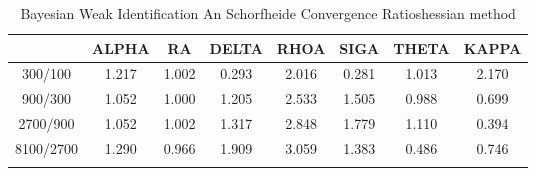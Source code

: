 \documentclass[a4paper,10pt]{article}
\begin{document}
\centering
\begin{longtable}{cccccccc}
\toprule
 & ALPHA & RA & DELTA & RHOA & SIGA & THETA & KAPPA \\
\midrule
300/100 & 1.217 & 1.002 & 0.293 & 2.016 & 0.281 & 1.013 & 2.170 \\
900/300 & 1.052 & 1.000 & 1.205 & 2.533 & 1.505 & 0.988 & 0.699 \\
2700/900 & 1.052 & 1.002 & 1.317 & 2.848 & 1.779 & 1.110 & 0.394 \\
8100/2700 & 1.290 & 0.966 & 1.909 & 3.059 & 1.383 & 0.486 & 0.746 \\
\bottomrule
\caption{Bayesian Weak Identification An Schorfheide Convergence Ratioshessian method}
\label{table:tbl:WeakAnSchoConvergenceRatios_hessian}
\end{longtable}
\end{document}
